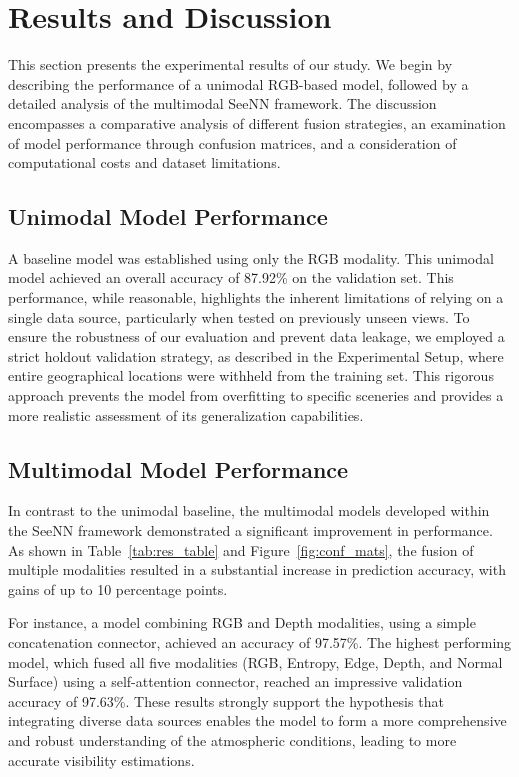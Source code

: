 \section{Results and Discussion}
\label{sec:results}

This section presents the experimental results of our study. We begin by describing the performance of a unimodal RGB-based model, followed by a detailed analysis of the multimodal SeeNN framework. The discussion encompasses a comparative analysis of different fusion strategies, an examination of model performance through confusion matrices, and a consideration of computational costs and dataset limitations.

\subsection{Unimodal Model Performance}

A baseline model was established using only the RGB modality. This unimodal model achieved an overall accuracy of 87.92\% on the validation set. This performance, while reasonable, highlights the inherent limitations of relying on a single data source, particularly when tested on previously unseen views. To ensure the robustness of our evaluation and prevent data leakage, we employed a strict holdout validation strategy, as described in the Experimental Setup, where entire geographical locations were withheld from the training set. This rigorous approach prevents the model from overfitting to specific sceneries and provides a more realistic assessment of its generalization capabilities.

\subsection{Multimodal Model Performance}

In contrast to the unimodal baseline, the multimodal models developed within the SeeNN framework demonstrated a significant improvement in performance. As shown in Table~\ref{tab:res_table} and Figure~\ref{fig:conf_mats}, the fusion of multiple modalities resulted in a substantial increase in prediction accuracy, with gains of up to 10 percentage points.

For instance, a model combining RGB and Depth modalities, using a simple concatenation connector, achieved an accuracy of 97.57\%. The highest performing model, which fused all five modalities (RGB, Entropy, Edge, Depth, and Normal Surface) using a self-attention connector, reached an impressive validation accuracy of 97.63\%. These results strongly support the hypothesis that integrating diverse data sources enables the model to form a more comprehensive and robust understanding of the atmospheric conditions, leading to more accurate visibility estimations.

